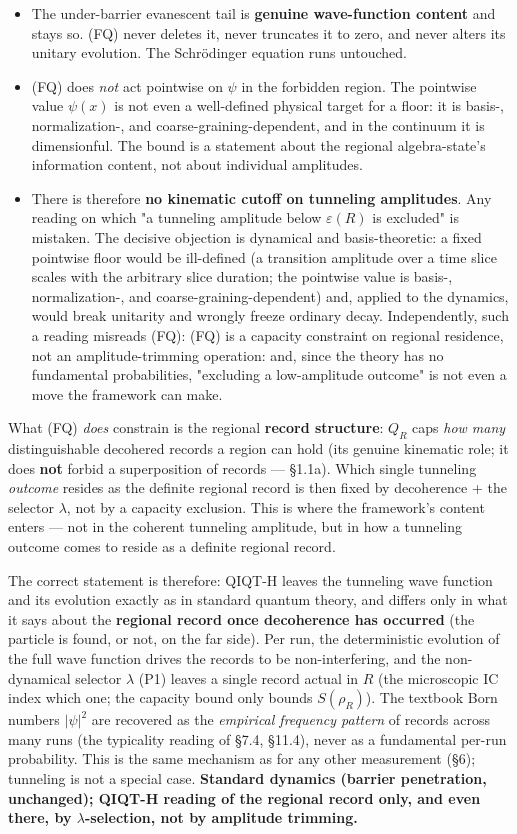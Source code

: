 \documentclass[11pt,a4paper]{article}
\begin{document}
\begin{itemize}
  \item The under-barrier evanescent tail is \textbf{genuine wave-function content} and stays so. (FQ) never deletes it, never truncates it to zero, and never alters its unitary evolution. The Schrödinger equation runs untouched.
  \item (FQ) does \emph{not} act pointwise on $\psi$ in the forbidden region. The pointwise value $\psi(x)$ is not even a well-defined physical target for a floor: it is basis-, normalization-, and coarse-graining-dependent, and in the continuum it is dimensionful. The bound is a statement about the regional algebra-state's information content, not about individual amplitudes.
  \item There is therefore \textbf{no kinematic cutoff on tunneling amplitudes}. Any reading on which "a tunneling amplitude below $\varepsilon(R)$ is excluded" is mistaken. The decisive objection is dynamical and basis-theoretic: a fixed pointwise floor would be ill-defined (a transition amplitude over a time slice scales with the arbitrary slice duration; the pointwise value is basis-, normalization-, and coarse-graining-dependent) and, applied to the dynamics, would break unitarity and wrongly freeze ordinary decay. Independently, such a reading misreads (FQ): (FQ) is a capacity constraint on regional residence, not an amplitude-trimming operation: and, since the theory has no fundamental probabilities, "excluding a low-amplitude outcome" is not even a move the framework can make.
\end{itemize}

What (FQ) \emph{does} constrain is the regional \textbf{record structure}: $Q_R$ caps \emph{how many} distinguishable decohered records a region can hold (its genuine kinematic role; it does \textbf{not} forbid a superposition of records — §1.1a). Which single tunneling \emph{outcome} resides as the definite regional record is then fixed by decoherence + the selector $\lambda$, not by a capacity exclusion. This is where the framework's content enters — not in the coherent tunneling amplitude, but in how a tunneling outcome comes to reside as a definite regional record.

The correct statement is therefore: QIQT-H leaves the tunneling wave function and its evolution exactly as in standard quantum theory, and differs only in what it says about the \textbf{regional record once decoherence has occurred} (the particle is found, or not, on the far side). Per run, the deterministic evolution of the full wave function drives the records to be non-interfering, and the non-dynamical selector $\lambda$ (P1) leaves a single record actual in $R$ (the microscopic IC index which one; the capacity bound only bounds $S(\rho_R)$). The textbook Born numbers $|\psi|^2$ are recovered as the \emph{empirical frequency pattern} of records across many runs (the typicality reading of §7.4, §11.4), never as a fundamental per-run probability. This is the same mechanism as for any other measurement (§6); tunneling is not a special case. \textbf{Standard dynamics (barrier penetration, unchanged); QIQT-H reading of the regional record only, and even there, by $\lambda$-selection, not by amplitude trimming.}
\end{document}
